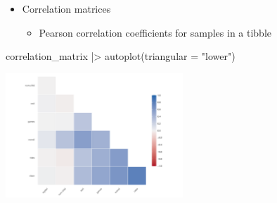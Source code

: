 \documentclass[
  ignorenonframetext,
]{beamer}
\newenvironment{Shaded}{\begin{snugshade}}{\end{snugshade}}
\newcommand{\AttributeTok}[1]{\textcolor[rgb]{0.40,0.45,0.13}{#1}}
\newcommand{\FunctionTok}[1]{\textcolor[rgb]{0.28,0.35,0.67}{#1}}
\newcommand{\NormalTok}[1]{\textcolor[rgb]{0.00,0.23,0.31}{#1}}
\newcommand{\SpecialCharTok}[1]{\textcolor[rgb]{0.37,0.37,0.37}{#1}}
\newcommand{\StringTok}[1]{\textcolor[rgb]{0.13,0.47,0.30}{#1}}
\providecommand{\tightlist}{%
  \setlength{\itemsep}{0pt}\setlength{\parskip}{0pt}}\usepackage{longtable,booktabs,array}
\begin{document}
\begin{frame}[fragile]{}
\label{section-7}
\begin{itemize}
\item
  Correlation matrices

  \begin{itemize}
  \tightlist
  \item
    Pearson correlation coefficients for samples in a tibble
  \end{itemize}
\end{itemize}

\tiny

\begin{Shaded}
\begin{Highlighting}[]
\NormalTok{correlation\_matrix }\SpecialCharTok{|\textgreater{}} \FunctionTok{autoplot}\NormalTok{(}\AttributeTok{triangular =} \StringTok{"lower"}\NormalTok{)}
\end{Highlighting}
\end{Shaded}

\begin{center}
\includegraphics[width=0.5\textwidth,height=\textheight]{007_identifying_drivers_of_outcomes_linear_models_files/figure-beamer/unnamed-chunk-6-1.pdf}
\end{center}
\end{frame}
\end{document}
